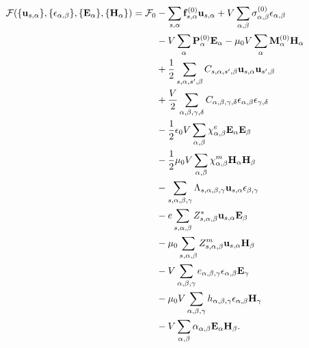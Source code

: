 \documentclass[12pt,a4paper,twoside]{report}
\begin{document}
\begin{align}
\mathcal{F}(\{{\bf u}_{s,\alpha}\}, \{\epsilon_{\alpha,\beta}\},
\{ {\bf E}_\alpha\}, \{{\bf H}_\alpha\})=\mathcal{F}_0 &-
\sum_{s,\alpha} {\bf f}^{(0)}_{s,\alpha} {\bf u}_{s,\alpha}+ 
V \sum_{\alpha,\beta}
\sigma^{(0)}_{\alpha,\beta} \epsilon_{\alpha,\beta} \nonumber \\ 
&- V \sum_{\alpha} {\bf P}^{(0)}_\alpha {\bf E}_\alpha - 
\mu_0 V \sum_{\alpha}
{\bf M}^{(0)}_\alpha {\bf H}_\alpha \nonumber \\
&+ {1\over 2}
\sum_{s,\alpha,s',\beta} C_{s,\alpha,s',\beta} {\bf u}_{s,\alpha}
{\bf u}_{s',\beta}\nonumber \\
&+ {V\over 2}\sum_{\alpha,\beta,\gamma,\delta} 
C_{\alpha,\beta,\gamma,\delta}  
\epsilon_{\alpha,\beta}
\epsilon_{\gamma,\delta} \nonumber \\
&- {1\over 2} \epsilon_0 V \sum_{\alpha,\beta} 
\chi^e_{\alpha,\beta}
{\bf E}_{\alpha}
{\bf E}_{\beta} \nonumber \\
&- {1\over 2} \mu_0 V \sum_{\alpha,\beta} 
\chi^m_{\alpha,\beta}
{\bf H}_{\alpha}
{\bf H}_{\beta} \nonumber \\
&- \sum_{s,\alpha,\beta,\gamma}
\Lambda_{s,\alpha,\beta,\gamma} {\bf u}_{s,\alpha}
\epsilon_{\beta,\gamma}\nonumber \\
&- e \sum_{s,\alpha,\beta} Z^*_{s,\alpha,\beta} 
{\bf u}_{s,\alpha} {\bf E}_{\beta} \nonumber \\
&- \mu_0 \sum_{s,\alpha,\beta} 
Z^m_{s,\alpha,\beta} {\bf u}_{s,\alpha}{\bf H}_{\beta} \nonumber \\
&- V \sum_{\alpha,\beta,\gamma} e_{\alpha,\beta,\gamma} 
\epsilon_{\alpha,\beta} {\bf E}_{\gamma} \nonumber \\
&- \mu_0 V \sum_{\alpha,\beta,\gamma}  h_{\alpha,\beta,\gamma} 
\epsilon_{\alpha,\beta} {\bf H}_{\gamma} \nonumber \\
&- V \sum_{\alpha,\beta} \alpha_{\alpha,\beta} {\bf E}_{\alpha}
{\bf H}_{\beta}.
\end{align}
\end{document}
